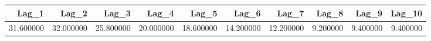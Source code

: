 \begin{tabular}{rrrrrrrrrr}
\toprule
Lag_1 & Lag_2 & Lag_3 & Lag_4 & Lag_5 & Lag_6 & Lag_7 & Lag_8 & Lag_9 & Lag_10 \\
\midrule
31.600000 & 32.000000 & 25.800000 & 20.000000 & 18.600000 & 14.200000 & 12.200000 & 9.200000 & 9.400000 & 9.400000 \\
\bottomrule
\end{tabular}
